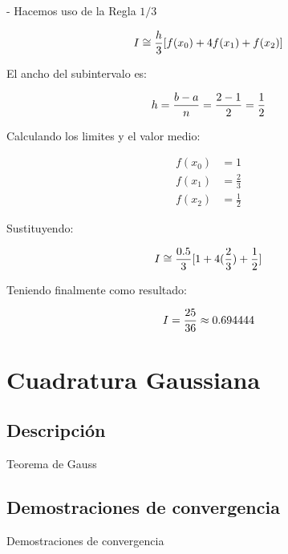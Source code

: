 \documentclass[journal,transmag]{IEEEtran}
\theoremstyle{mytheoremstyle}
\theoremstyle{mytheoremstyle}
\theoremstyle{myproblemstyle}
\begin{document}
            - Hacemos uso de la Regla $1/3$

            \begin{equation} \notag
                I \cong \frac{h}{3}[f(x_0) + 4f(x_1) + f(x_2)]
            \end{equation}

            El ancho del subintervalo es:

            \begin{equation} \notag
                h = \frac{b - a}{n} = \frac{2 - 1}{2} = \frac{1}{2}
            \end{equation}

            Calculando los limites y el valor medio:

            \begin{align*}
                f(x_0) &= 1 \\
                f(x_1) &= \frac{2}{3} \\
                f(x_2) &= \frac{1}{2}
            \end{align*}

            Sustituyendo:

            \begin{equation} \notag
                I \cong \frac{0.5}{3}[1 + 4(\frac{2}{3}) + \frac{1}{2}]
            \end{equation}

            Teniendo finalmente como resultado:

            \begin{equation} \notag
                I = \frac{25}{36} \approx 0.694444 
            \end{equation}

\section{Cuadratura Gaussiana}
\subsection{Descripción}
\begin{lipsum}
    Teorema de Gauss
\end{lipsum}
\subsection{Demostraciones de convergencia}
\begin{lipsum}
    Demostraciones de convergencia
\end{lipsum}
\end{document}
